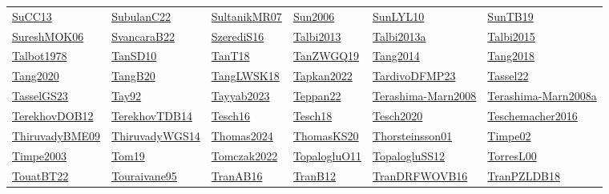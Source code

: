 \begin{longtable}{*{6}{l}}
\hyperref[detail:SuCC13]{SuCC13} & \hyperref[detail:SubulanC22]{SubulanC22} & \hyperref[detail:SultanikMR07]{SultanikMR07} & \hyperref[detail:Sun2006]{Sun2006} & \hyperref[detail:SunLYL10]{SunLYL10} & \hyperref[detail:SunTB19]{SunTB19}\\ 
\hyperref[detail:SureshMOK06]{SureshMOK06} & \hyperref[detail:SvancaraB22]{SvancaraB22} & \hyperref[detail:SzerediS16]{SzerediS16} & \hyperref[detail:Talbi2013]{Talbi2013} & \hyperref[detail:Talbi2013a]{Talbi2013a} & \hyperref[detail:Talbi2015]{Talbi2015}\\ 
\hyperref[detail:Talbot1978]{Talbot1978} & \hyperref[detail:TanSD10]{TanSD10} & \hyperref[detail:TanT18]{TanT18} & \hyperref[detail:TanZWGQ19]{TanZWGQ19} & \hyperref[detail:Tang2014]{Tang2014} & \hyperref[detail:Tang2018]{Tang2018}\\ 
\hyperref[detail:Tang2020]{Tang2020} & \hyperref[detail:TangB20]{TangB20} & \hyperref[detail:TangLWSK18]{TangLWSK18} & \hyperref[detail:Tapkan2022]{Tapkan2022} & \hyperref[detail:TardivoDFMP23]{TardivoDFMP23} & \hyperref[detail:Tassel22]{Tassel22}\\ 
\hyperref[detail:TasselGS23]{TasselGS23} & \hyperref[detail:Tay92]{Tay92} & \hyperref[detail:Tayyab2023]{Tayyab2023} & \hyperref[detail:Teppan22]{Teppan22} & \hyperref[detail:Terashima-Marn2008]{Terashima-Marn2008} & \hyperref[detail:Terashima-Marn2008a]{Terashima-Marn2008a}\\ 
\hyperref[detail:TerekhovDOB12]{TerekhovDOB12} & \hyperref[detail:TerekhovTDB14]{TerekhovTDB14} & \hyperref[detail:Tesch16]{Tesch16} & \hyperref[detail:Tesch18]{Tesch18} & \hyperref[detail:Tesch2020]{Tesch2020} & \hyperref[detail:Teschemacher2016]{Teschemacher2016}\\ 
\hyperref[detail:ThiruvadyBME09]{ThiruvadyBME09} & \hyperref[detail:ThiruvadyWGS14]{ThiruvadyWGS14} & \hyperref[detail:Thomas2024]{Thomas2024} & \hyperref[detail:ThomasKS20]{ThomasKS20} & \hyperref[detail:Thorsteinsson01]{Thorsteinsson01} & \hyperref[detail:Timpe02]{Timpe02}\\ 
\hyperref[detail:Timpe2003]{Timpe2003} & \hyperref[detail:Tom19]{Tom19} & \hyperref[detail:Tomczak2022]{Tomczak2022} & \hyperref[detail:TopalogluO11]{TopalogluO11} & \hyperref[detail:TopalogluSS12]{TopalogluSS12} & \hyperref[detail:TorresL00]{TorresL00}\\ 
\hyperref[detail:TouatBT22]{TouatBT22} & \hyperref[detail:Touraivane95]{Touraivane95} & \hyperref[detail:TranAB16]{TranAB16} & \hyperref[detail:TranB12]{TranB12} & \hyperref[detail:TranDRFWOVB16]{TranDRFWOVB16} & \hyperref[detail:TranPZLDB18]{TranPZLDB18}\\ 

\end{longtable}
